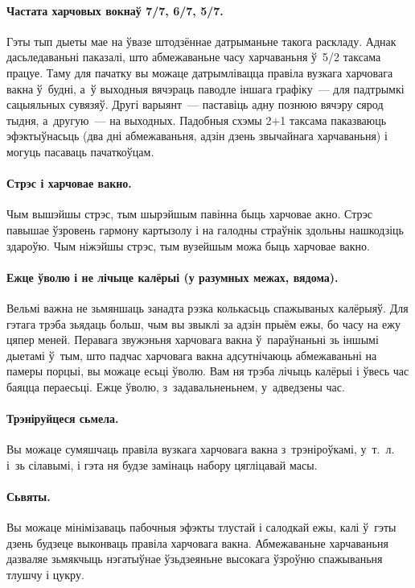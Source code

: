\paragraph{Частата харчовых вокнаў 7/7, 6/7, 5/7.}
Гэты тып дыеты мае на ўвазе штодзённае датрыманьне такога раскладу. Аднак дасьледаваньні паказалі, што абмежаваньне часу харчаваньня ў~5/2 таксама працуе. Таму для пачатку вы можаце датрымлівацца правіла вузкага харчовага вакна ў~будні, а~ў выходныя вячэраць паводле іншага графіку~--- для падтрымкі сацыяльных сувязяў. Другі варыянт~--- паставіць адну познюю вячэру сярод тыдня, а~другую~--- на выходных. Падобныя схэмы 2\kern0.5pt+1 таксама паказваюць эфэктыўнасьць (два дні абмежаваньня, адзін дзень звычайнага харчаваньня) і могуць пасаваць пачаткоўцам.

\paragraph{Стрэс і харчовае вакно.}
Чым вышэйшы стрэс, тым шырэйшым павінна быць харчовае акно. Стрэс павышае ўзровень гармону картызолу і на галодны страўнік здольны нашкодзіць здароўю. Чым ніжэйшы стрэс, тым вузейшым можа быць харчовае вакно.

\paragraph{Ежце ўволю і не лічыце калёрыі (у разумных межах, вядома).}
Вельмі важна не зьмяншаць занадта рэзка колькасьць спажываных калёрыяў. Для гэтага трэба зьядаць больш, чым вы звыклі за адзін прыём ежы, бо часу на ежу цяпер меней. Перавага звужэньня харчовага вакна ў~параўнаньні зь іншымі дыетамі ў~тым, што падчас харчовага вакна адсутнічаюць абмежаваньні на памеры порцыі, вы можаце есьці ўволю. Вам ня трэба лічыць калёрыі і ўвесь час баяцца пераесьці. Ежце ўволю, з~задавальненьнем, у~адведзены час.

\paragraph{Трэніруйцеся сьмела.}
Вы можаце сумяшчаць правіла вузкага харчовага вакна з~трэніроўкамі, у~т.~л. і~зь сілавымі, і гэта ня будзе замінаць набору цягліцавай масы.

\paragraph{Сьвяты.}
Вы можаце мінімізаваць пабочныя эфэкты тлустай і салодкай ежы, калі ў~гэты дзень будзеце выконваць правіла харчовага вакна. Абмежаваньне харчаваньня дазваляе зьмякчыць нэгатыўнае ўзьдзеяньне высокага ўзроўню спажываньня тлушчу і цукру.

